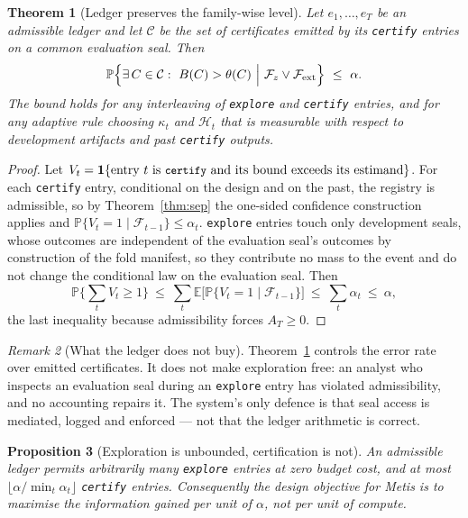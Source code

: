 \documentclass[11pt,a4paper]{article}
\newtheorem{theorem}{Theorem}[section]
\newtheorem{proposition}[theorem]{Proposition}
\theoremstyle{definition}
\theoremstyle{remark}
\newtheorem{remark}[theorem]{Remark}
\newcommand{\E}{\mathbb{E}}
\newcommand{\Prob}{\mathbb{P}}
\newcommand{\Fcal}{\mathcal{F}}
\newcommand{\Hcal}{\mathcal{H}}
\newcommand{\code}[1]{\texttt{\small#1}}
\newcommand{\ind}{\mathbf{1}}
\begin{document}
\begin{theorem}[Ledger preserves the family-wise level]\label{thm:ledger}
Let $e_1,\dots,e_T$ be an admissible ledger and let $\mathcal{C}$ be the set of certificates emitted by its \code{certify} entries on a common evaluation seal. Then
\[
\Prob\Big\{\exists\,C\in\mathcal{C}:\ B(C)>\theta(C)\ \Big|\ \Fcal_z\vee\Fcal_{\rm ext}\Big\}\ \le\ \alpha .
\]
The bound holds for any interleaving of \code{explore} and \code{certify} entries, and for any adaptive rule choosing $\kappa_t$ and $\Hcal_t$ that is measurable with respect to development artifacts and past \code{certify} outputs.
\end{theorem}

\begin{proof}
Let $V_t=\ind\{\text{entry }t\text{ is \code{certify} and its bound exceeds its estimand}\}$. For each \code{certify} entry, conditional on the design and on the past, the registry is admissible, so by Theorem~\ref{thm:sep} the one-sided confidence construction applies and $\Prob\{V_t=1\mid\Fcal_{t-1}\}\le\alpha_t$. \code{explore} entries touch only development seals, whose outcomes are independent of the evaluation seal's outcomes by construction of the fold manifest, so they contribute no mass to the event and do not change the conditional law on the evaluation seal. Then
\[
\Prob\Big\{\textstyle\sum_t V_t\ge1\Big\}\ \le\ \textstyle\sum_t\E\big[\Prob\{V_t=1\mid\Fcal_{t-1}\}\big]\ \le\ \textstyle\sum_t\alpha_t\ \le\ \alpha,
\]
the last inequality because admissibility forces $A_T\ge0$. \end{proof}

\begin{remark}[What the ledger does not buy]
Theorem~\ref{thm:ledger} controls the error rate over emitted certificates. It does not make exploration free: an analyst who inspects an evaluation seal during an \code{explore} entry has violated admissibility, and no accounting repairs it. The system's only defence is that seal access is mediated, logged and enforced --- not that the ledger arithmetic is correct.
\end{remark}

\begin{proposition}[Exploration is unbounded, certification is not]
An admissible ledger permits arbitrarily many \code{explore} entries at zero budget cost, and at most $\lfloor\alpha/\min_t\alpha_t\rfloor$ \code{certify} entries. Consequently the design objective for Metis is to maximise the information gained per unit of $\alpha$, not per unit of compute.
\end{proposition}
\end{document}
